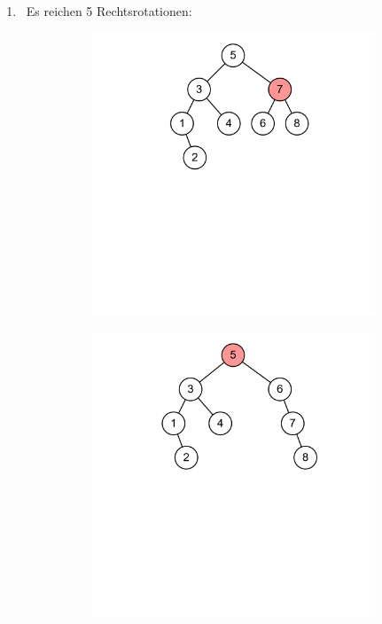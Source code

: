 \documentclass[11pt,a4paper]{article}
\begin{document}
\begin{loesung}
\begin{enumerate}
        \item \ Es reichen 5 Rechtsrotationen:
        \begin{figure}[h!]
            \centering
            \begin{subfigure}[b]{0.23\textwidth}
                \centering
                \includegraphics[width=\textwidth]{img/1b/2}
            \end{subfigure}
            \begin{subfigure}[b]{0.23\textwidth}
                \centering
                \includegraphics[width=\textwidth]{img/1b/3}

\end{subfigure}
\end{figure}
\end{enumerate}
\end{loesung}
\end{document}
